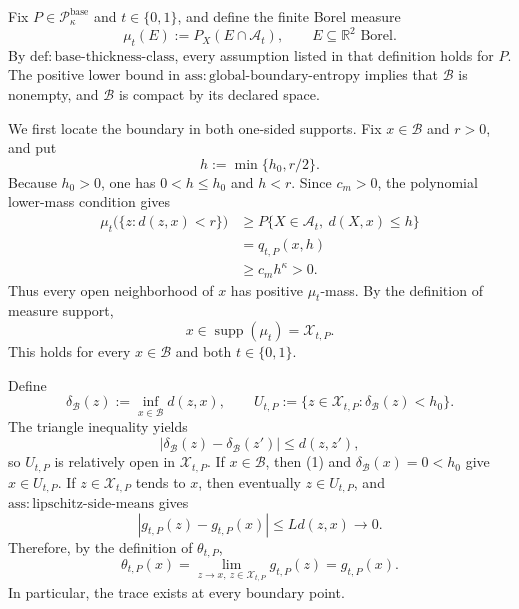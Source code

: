 Fix \(P\in\mathcal P_{\kappa}^{\mathrm{base}}\) and \(t\in\{0,1\}\), and define the finite Borel measure
\[
 \mu_t(E):=P_X(E\cap\mathcal A_t),
 \qquad E\subseteq\mathbb R^2\text{ Borel}.
\]
By \(\mathrm{def:base\text{-}thickness\text{-}class}\), every assumption listed in that definition holds for \(P\). The positive lower bound in \(\mathrm{ass:global\text{-}boundary\text{-}entropy}\) implies that \(\mathcal B\) is nonempty, and \(\mathcal B\) is compact by its declared space.

We first locate the boundary in both one-sided supports. Fix \(x\in\mathcal B\) and \(r>0\), and put
\[
 h:=\min\{h_0,r/2\}.
\]
Because \(h_0>0\), one has \(0<h\le h_0\) and \(h<r\). Since \(c_m>0\), the polynomial lower-mass condition gives
\[
 \begin{aligned}
 \mu_t\bigl(\{z:d(z,x)<r\}\bigr)
 &\ge P\{X\in\mathcal A_t,\ d(X,x)\le h\}\\
 &=q_{t,P}(x,h)\\
 &\ge c_m h^{\kappa}>0.
 \end{aligned}
\]
Thus every open neighborhood of \(x\) has positive \(\mu_t\)-mass. By the definition of measure support,
\[
 x\in\operatorname{supp}(\mu_t)=\mathcal X_{t,P}.
 \tag{1}
\]
This holds for every \(x\in\mathcal B\) and both \(t\in\{0,1\}\).

Define
\[
 \delta_{\mathcal B}(z):=\inf_{x\in\mathcal B}d(z,x),
 \qquad
 U_{t,P}:=\{z\in\mathcal X_{t,P}:\delta_{\mathcal B}(z)<h_0\}.
\]
The triangle inequality yields
\[
 |\delta_{\mathcal B}(z)-\delta_{\mathcal B}(z')|\le d(z,z'),
 \tag{2}
\]
so \(U_{t,P}\) is relatively open in \(\mathcal X_{t,P}\). If \(x\in\mathcal B\), then (1) and \(\delta_{\mathcal B}(x)=0<h_0\) give \(x\in U_{t,P}\). If \(z\in\mathcal X_{t,P}\) tends to \(x\), then eventually \(z\in U_{t,P}\), and \(\mathrm{ass:lipschitz\text{-}side\text{-}means}\) gives
\[
 |g_{t,P}(z)-g_{t,P}(x)|\le Ld(z,x)\longrightarrow0.
\]
Therefore, by the definition of \(\theta_{t,P}\),
\[
 \theta_{t,P}(x)
 =\lim_{z\to x,\ z\in\mathcal X_{t,P}}g_{t,P}(z)
 =g_{t,P}(x).
 \tag{3}
\]
In particular, the trace exists at every boundary point.

